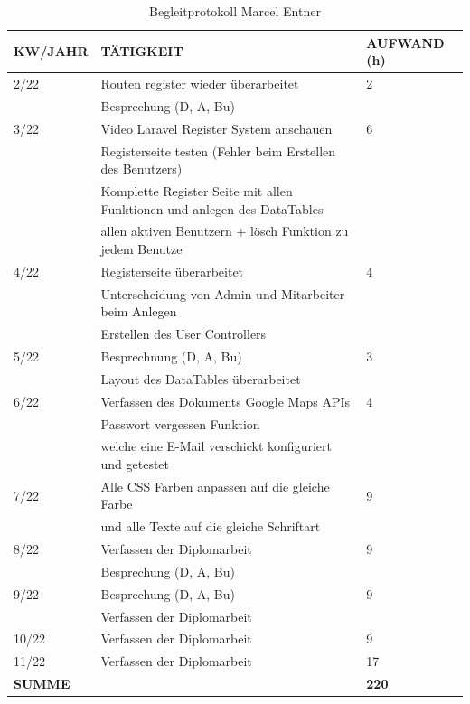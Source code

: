 \begin{table}[h]
	\begin{tabular}{|l|l|l|}
		\hline
		\textbf{KW/JAHR} &     \textbf{TÄTIGKEIT}  & 	\textbf{AUFWAND (h)}    \\ \hline
		
		2/22 & Routen register wieder überarbeitet & 2 \\
			 & Besprechung (D, A, Bu)&\\ \hline
		3/22 & Video Laravel Register System anschauen & 6\\
			 & Registerseite testen (Fehler beim Erstellen des Benutzers) &\\
			 &Komplette Register Seite mit allen Funktionen und anlegen des DataTables &\\
			 &allen aktiven Benutzern + lösch Funktion zu jedem Benutze&\\ \hline
		4/22 &Registerseite überarbeitet & 4\\
			 &Unterscheidung von Admin und Mitarbeiter beim Anlegen &\\
			 &Erstellen des User Controllers&\\ \hline
		5/22 &Besprechnung (D, A, Bu)& 3\\
			 &Layout des DataTables überarbeitet& \\ \hline
		6/22 & Verfassen des Dokuments Google Maps APIs& 4\\
			 &Passwort vergessen Funktion &\\
			 &welche eine E-Mail verschickt konfiguriert und getestet&\\ \hline
		7/22 &Alle CSS Farben anpassen auf die gleiche Farbe & 9\\
			 & und alle Texte auf die gleiche Schriftart &\\ \hline
		8/22 & Verfassen der Diplomarbeit & 9\\
			 &Besprechung (D, A, Bu)& \\ \hline
		9/22 &Besprechung (D, A, Bu) & 9\\ 
			 &Verfassen der Diplomarbeit&\\ \hline
		10/22&Verfassen der Diplomarbeit& 9\\ \hline
		11/22&Verfassen der Diplomarbeit& 17\\ \hline
		\textbf{SUMME} & & \textbf{220}\\ \hline
			 
		
		
		
			 
		
	\end{tabular}
	\caption{Begleitprotokoll Marcel Entner}
\end{table}



